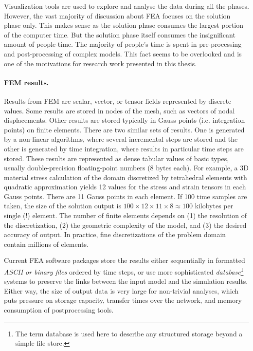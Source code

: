 Visualization tools are used to explore and analyse the data during all the phases. However, the vast majority of discussion about FEA focuses on the solution phase only. This makes sense as the solution phase consumes the largest portion of the computer time. But the solution phase itself consumes the insignificant amount of people-time. The majority of people's time is spent in pre-processing and post-processing of complex models. This fact seems to be overlooked and is one of the motivations for research work presented in this thesis.

\paragraph{FEM results.} Results from FEM are scalar, vector, or tensor fields represented by discrete values. Some results are stored in nodes of the mesh, such as vectors of nodal displacements. Other results are stored typically in Gauss points (i.e. integration points) on finite elements. There are two similar sets of results. One is generated by a non-linear algorithms, where several incremental steps are stored and the other is generated by time integration, where results in particular time steps are stored. These results are represented as dense tabular values of basic types, usually double-precision floating-point numbers (8 bytes each). For example, a 3D material stress calculation of the domain discretized by tetrahedral elements with quadratic approximation yields 12 values for the stress and strain tensors in each Gauss points. There are 11 Gauss points in each element. If 100 time samples are taken, the size of the solution output is $100 \times 12 \times 11 \times 8 \approx 100$ kilobytes per single (!) element. The number of finite elements depends on (1) the resolution of the discretization, (2) the geometric complexity of the model, and (3) the desired accuracy of output. In practice, fine discretizations of the problem domain contain millions of elements.

Current FEA software packages store the results either sequentially in formatted \textit{ASCII or binary files} ordered by time steps, or use more sophisticated \textit{database}\footnote{The term database is used here to describe any structured storage beyond a simple file store.} systems to preserve the links between the input model and the simulation results. Either way, the size of output data is very large for non-trivial analyses, which puts pressure on storage capacity, transfer times over the network, and memory consumption of postprocessing tools.

